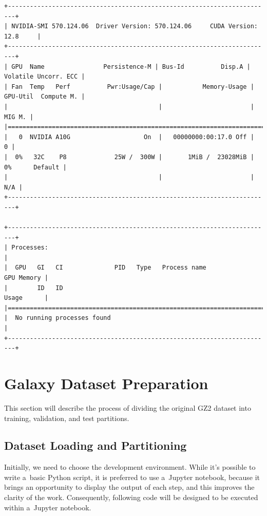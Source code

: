 \begin{lstlisting}[style=mypython, caption={nvidia-smi command output}, label={lst:gpu}]
+------------------------------------------------------------------------+
| NVIDIA-SMI 570.124.06  Driver Version: 570.124.06     CUDA Version: 12.8     |
+------------------------------------------------------------------------+
| GPU  Name                Persistence-M | Bus-Id          Disp.A | Volatile Uncorr. ECC |
| Fan  Temp   Perf          Pwr:Usage/Cap |           Memory-Usage | GPU-Util  Compute M. |
|                                         |                        |               MIG M. |
|========================================================================|
|   0  NVIDIA A10G                    On  |   00000000:00:17.0 Off |                    0 |
|  0%   32C    P8             25W /  300W |       1MiB /  23028MiB |      0%      Default |
|                                         |                        |                  N/A |
+------------------------------------------------------------------------+
                                                                                         
+------------------------------------------------------------------------+
| Processes:                                                                              |
|  GPU   GI   CI              PID   Type   Process name                        GPU Memory |
|        ID   ID                                                               Usage      |
|========================================================================|
|  No running processes found                                                             |
+------------------------------------------------------------------------+
\end{lstlisting}

\section{Galaxy Dataset Preparation}
\label{sec:05-dataset}

This section will describe the process of dividing the original GZ2 dataset into training, validation, and test partitions. 

\subsection*{Dataset Loading and Partitioning}

Initially, we need to choose the development environment. While it's possible to write a~basic Python script, it is preferred to use a~Jupyter notebook, because it brings an opportunity to display the output of each step, and this improves the clarity of the work. Consequently, following code will be designed to be executed within a~Jupyter notebook.

